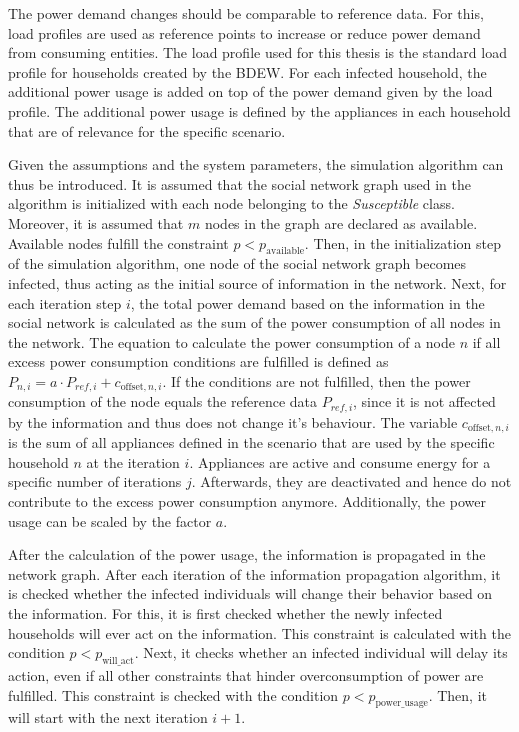 The power demand changes should be comparable to reference data.
For this, load profiles are used as reference points to increase
or reduce power demand from consuming entities.
The load profile used for this thesis is the standard load profile
for households created by the BDEW.
For each infected household, the additional power usage is 
added on top of the power demand given by the load profile.
The additional power usage is defined by the appliances in each
household that are of relevance for the specific scenario. 

Given the assumptions and the system parameters, the simulation 
algorithm can thus be introduced. 
It is assumed that the social network graph used in the algorithm
is initialized with each node belonging to the \textit{Susceptible} class.
Moreover, it is assumed that $m$ nodes in the graph are declared
as available. Available nodes fulfill the constraint 
$p < p_{\mathrm{available}}$.
Then, in the initialization step of the simulation algorithm,
one node of the social network graph becomes infected,
thus acting as the initial source of information in the network.
Next, for each iteration step $i$, the total power demand 
based on the information in the social network is calculated 
as the sum of the power consumption of all nodes in the network. 
The equation to calculate the power consumption 
of a node $n$ if all excess power consumption conditions are fulfilled
is defined as 
$P_{n,i}=a \cdot P_{ref, i}+c_{\mathrm{offset}, n, i}$. 
If the conditions are not fulfilled, then the power consumption of the node 
equals the reference data $P_{ref, i}$, since it is 
not affected by the information and thus does not change it's
behaviour.
The variable $c_{\mathrm{offset}, n, i}$
is the sum of all appliances defined in the 
scenario that are used by the 
specific household $n$ at the iteration $i$.
Appliances are active and consume energy 
for a specific number of iterations $j$.
Afterwards, they are deactivated and hence do not contribute to 
the excess power consumption anymore.
Additionally, the power usage can be 
scaled by the factor $a$.

After the calculation of the power usage, the information is 
propagated in the network graph. 
After each iteration of the information propagation algorithm,
it is checked whether the infected individuals will change their behavior
based on the information. For this, it is first checked whether
the newly infected households will ever act on the information.
This constraint is calculated with the condition
$p<p_{\mathrm{will\_act}}$.
Next, it checks whether
an infected individual will delay its action, even if
all other constraints that hinder overconsumption of power
are fulfilled. This constraint is checked with the
condition $p<p_{\mathrm{power\_usage}}$. 
Then, it will start with the next iteration $i+1$.

